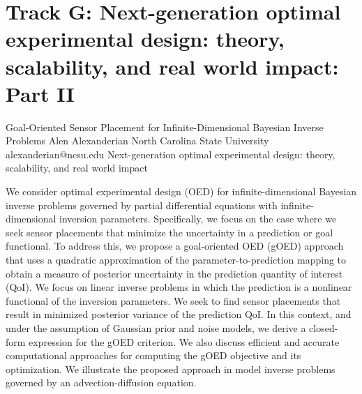 \section{Track G: Next-generation optimal experimental design: theory, scalability, and real world impact: Part II}\newpage

\begin{talk}
  {Goal-Oriented Sensor Placement for Infinite-Dimensional Bayesian Inverse Problems}%
  {Alen Alexanderian}%
  {North Carolina State University}%
  {alexanderian@ncsu.edu}%
  {}
  {Next-generation optimal experimental design: theory, scalability, and real world impact}%
    
   
We consider optimal experimental design (OED) for infinite-dimensional Bayesian
inverse problems governed by partial differential equations with
infinite-dimensional inversion parameters.  Specifically, we focus on the case
where we seek sensor placements that minimize the uncertainty in a prediction or
goal functional.  To address this, we propose a goal-oriented OED (gOED)
approach that uses a quadratic approximation of the parameter-to-prediction
mapping to obtain a measure of posterior uncertainty in the prediction quantity
of interest (QoI).  We focus on linear inverse problems in which the prediction
is a nonlinear functional of the inversion parameters. We seek to find sensor
placements that result in minimized posterior variance of the prediction QoI. In
this context, and under the assumption of Gaussian prior and noise models, we
derive a closed-form expression for the gOED criterion. We also discuss
efficient and accurate computational approaches for computing the gOED objective
and its optimization.  We illustrate the proposed approach in model inverse
problems governed by an advection-diffusion equation.

\medskip

\end{talk}

